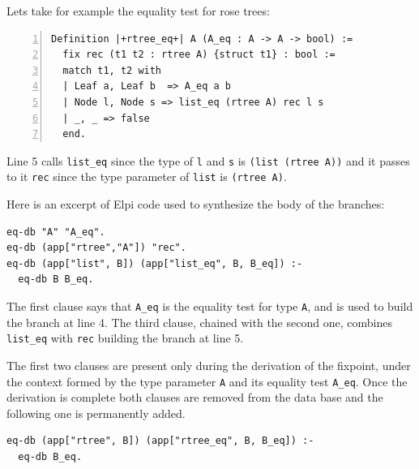 \documentclass[sigplan,10pt,review]{acmart}\settopmatter{printfolios=true,printccs=false,printacmref=false}
\begin{document}
Lets take for example the equality test for rose trees:

\begin{minipage}{\textwidth}\begin{lstlisting}[numbers=left]
Definition |+rtree_eq+| A (A_eq : A -> A -> bool) :=
  fix rec (t1 t2 : rtree A) {struct t1} : bool :=
  match t1, t2 with
  | Leaf a, Leaf b  => A_eq a b
  | Node l, Node s => list_eq (rtree A) rec l s
  | _, _ => false
  end.
\end{lstlisting}\end{minipage}

\noindent
Line 5 calls \lstinline+list_eq+ since the type of \lstinline+l+ and
\lstinline+s+ is \lstinline+(list (rtree A))+ and it passes to it
\lstinline+rec+ since the type parameter of \lstinline+list+ is
\lstinline+(rtree A)+.

Here is an excerpt of Elpi code used to synthesize the body of the
branches:

\begin{minipage}{\textwidth}\begin{lstlisting}
eq-db "A" "A_eq".
eq-db (app["rtree","A"]) "rec".
eq-db (app["list", B]) (app["list_eq", B, B_eq]) :-
  eq-db B B_eq.
\end{lstlisting}\end{minipage}

\noindent
The first clause says that \lstinline+A_eq+ is the equality test for type
\lstinline+A+, and is used to build the branch at line 4.
The third clause, chained with the second one, combines
\lstinline+list_eq+ with \lstinline+rec+ building the branch at line
5.

The first two clauses are present only during the
derivation of the fixpoint, under the context formed by
the type parameter \lstinline+A+ and its equality test
\lstinline+A_eq+. 
Once the derivation is complete both clauses are removed 
from the data base and the
following one is permanently added.

\begin{minipage}{\textwidth}\begin{lstlisting}[]
eq-db (app["rtree", B]) (app["rtree_eq", B, B_eq]) :-
  eq-db B_eq.
\end{lstlisting}\end{minipage}


% 
% 
\end{document}
